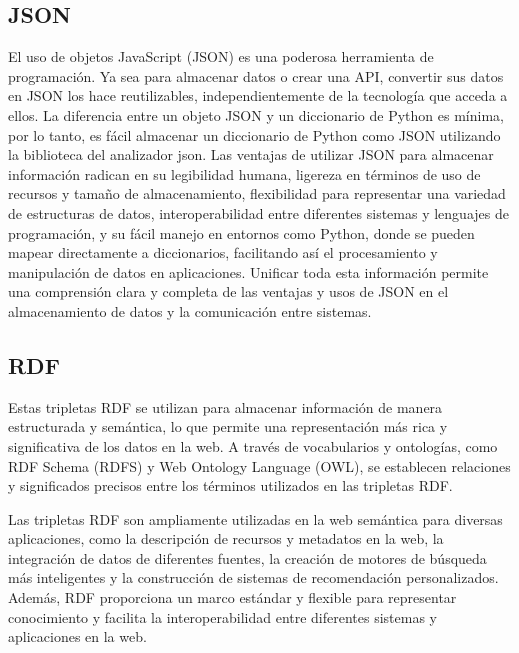 \subsection{JSON}
El uso de objetos JavaScript (JSON) es una poderosa herramienta de programación. Ya sea para almacenar datos o crear una API, convertir sus datos en JSON los hace reutilizables, independientemente de la tecnología que acceda a ellos. La diferencia entre un objeto JSON y un diccionario de Python es mínima, por lo tanto, es fácil almacenar un diccionario de Python como JSON utilizando la biblioteca del analizador json. Las ventajas de utilizar JSON para almacenar información radican en su legibilidad humana, ligereza en términos de uso de recursos y tamaño de almacenamiento, flexibilidad para representar una variedad de estructuras de datos, interoperabilidad entre diferentes sistemas y lenguajes de programación, y su fácil manejo en entornos como Python, donde se pueden mapear directamente a diccionarios, facilitando así el procesamiento y manipulación de datos en aplicaciones. Unificar toda esta información permite una comprensión clara y completa de las ventajas y usos de JSON en el almacenamiento de datos y la comunicación entre sistemas.

\subsection{RDF}


Estas tripletas RDF se utilizan para almacenar información de manera estructurada y semántica, lo que permite una representación más rica y significativa de los datos en la web. A través de vocabularios y ontologías, como RDF Schema (RDFS) y Web Ontology Language (OWL), se establecen relaciones y significados precisos entre los términos utilizados en las tripletas RDF.

Las tripletas RDF son ampliamente utilizadas en la web semántica para diversas aplicaciones, como la descripción de recursos y metadatos en la web, la integración de datos de diferentes fuentes, la creación de motores de búsqueda más inteligentes y la construcción de sistemas de recomendación personalizados. Además, RDF proporciona un marco estándar y flexible para representar conocimiento y facilita la interoperabilidad entre diferentes sistemas y aplicaciones en la web.

